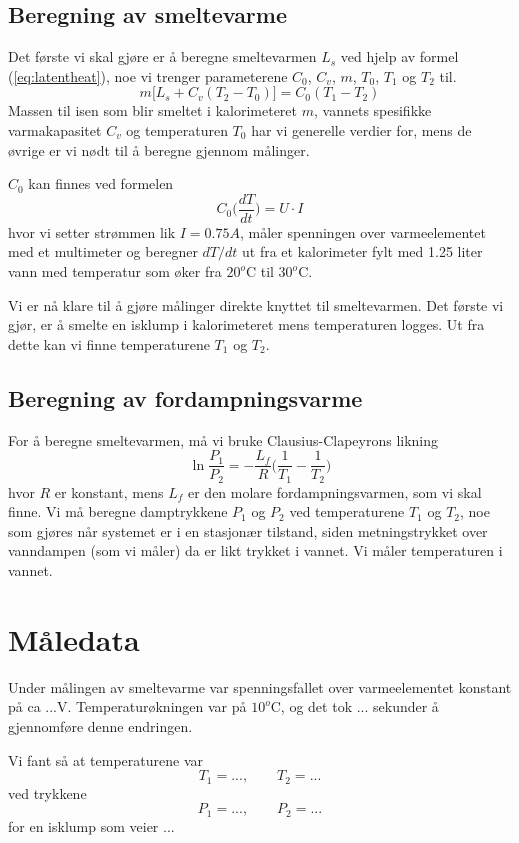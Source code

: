 \documentclass[norsk,a4paper,12pt]{article}
\begin{document}
\subsection{Beregning av smeltevarme}
Det første vi skal gjøre er å beregne smeltevarmen $L_s$ ved hjelp av formel (\ref{eq:latentheat}), noe vi trenger parameterene $C_0$, $C_v$, $m$, $T_0$, $T_1$ og $T_2$ til. 
\begin{equation}
m\Big[L_s+C_v(T_2-T_0)\Big] = C_0(T_1-T_2)
\label{eq:latentheat}
\end{equation}
Massen til isen som blir smeltet i kalorimeteret $m$, vannets spesifikke varmakapasitet $C_v$ og temperaturen $T_0$ har vi generelle verdier for, mens de øvrige er vi nødt til å beregne gjennom målinger.\par
$C_0$ kan finnes ved formelen
\begin{equation}
C_0\bigg(\frac{dT}{dt}\bigg)=U\cdot I
\end{equation}
hvor vi setter strømmen lik $I=0.75A$, måler spenningen over varmeelementet med et multimeter og beregner $dT/dt$ ut fra et kalorimeter fylt med 1.25 liter vann med temperatur som øker fra $20^o$C til $30^o$C.\par
Vi er nå klare til å gjøre målinger direkte knyttet til smeltevarmen. Det første vi gjør, er å smelte en isklump i kalorimeteret mens temperaturen logges. Ut fra dette kan vi finne temperaturene $T_1$ og $T_2$.

\subsection{Beregning av fordampningsvarme}
For å beregne smeltevarmen, må vi bruke Clausius-Clapeyrons likning
\begin{equation}
\ln\frac{P_1}{P_2}=-\frac{L_f}{R}\bigg(\frac{1}{T_1}-\frac{1}{T_2}\bigg)
\end{equation}
hvor $R$ er konstant, mens $L_f$ er den molare fordampningsvarmen, som vi skal finne. Vi må beregne damptrykkene $P_1$ og $P_2$ ved temperaturene $T_1$ og $T_2$, noe som gjøres når systemet er i en stasjonær tilstand, siden metningstrykket over vanndampen (som vi måler) da er likt trykket i vannet. Vi måler temperaturen i vannet. 

\section{Måledata}
Under målingen av smeltevarme var spenningsfallet over varmeelementet konstant på ca ...V. Temperaturøkningen var på $10^o$C, og det tok ... sekunder å gjennomføre denne endringen.\par 
Vi fant så at temperaturene var
\begin{equation}
T_1=...,\quad\quad T_2=...
\end{equation}
ved trykkene
\begin{equation}
P_1=...,\quad\quad P_2=...
\end{equation}
for en isklump som veier ...
\end{document}
